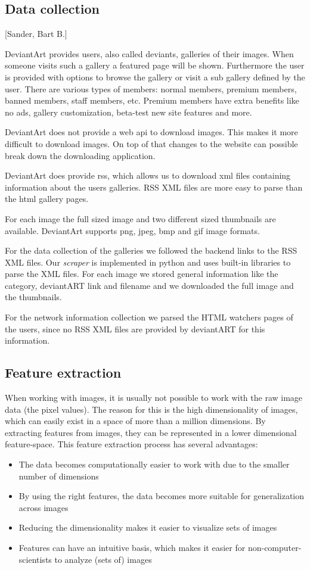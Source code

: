 \subsection{Data collection}
[Sander, Bart B.]

DeviantArt provides users, also called deviants, galleries of their images. 
When someone visits such a gallery a featured page will be shown. Furthermore
the user is provided with options to browse the gallery or visit a sub gallery
defined by the user. There are various types of members: normal members, premium 
members, banned members, staff members, etc. Premium members have extra benefits
like no ads, gallery customization, beta-test new site features and more.

DeviantArt does not provide a web api to download images. This makes it more 
difficult to download images. On top of that changes to the website can possible break
down the downloading application.

DeviantArt does provide rss, which allows us to download xml files containing 
information about the users galleries. RSS XML files are more easy to parse
than the html gallery pages.

For each image the full sized image and two different sized thumbnails are 
available. DeviantArt supports png, jpeg, bmp and gif image formats.

For the data collection of the galleries we followed the backend links to
the RSS XML files. Our \textit{scraper} is implemented in python and uses
built-in libraries to parse the XML files. For each image we stored general 
information like the category, deviantART link and filename and we downloaded
the full image and the thumbnails.

For the network information collection we parsed the HTML watchers pages
of the users, since no RSS XML files are provided by deviantART for this
information.

\subsection{Feature extraction}
When working with images, it is usually not possible to work with the raw image data (the pixel values). The reason for this is the high dimensionality of images, which can easily exist in a space of more than a million dimensions. By extracting features from images, they can be represented in a lower dimensional feature-space.  This feature extraction process has several advantages:
\begin{itemize}
\item The data becomes computationally easier to work with due to the smaller number of dimensions
\item By using the right features, the data becomes more suitable for generalization across images
\item Reducing the dimensionality makes it easier to visualize sets of images
\item Features can have an intuitive basis, which makes it easier for non-computer-scientists to analyze (sets of) images
\end{itemize}

